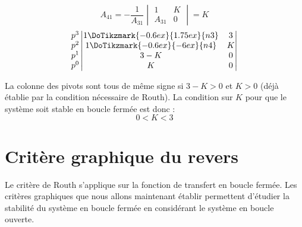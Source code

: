\[
A_{41}=-\dfrac{1}{A_{31}}\begin{vmatrix} 1 & K \\ A_{31} & 0 \end{vmatrix}=K
\]
\[
\begin{matrix}
    p^3 \\
    p^2 \\
    p^1 \\
    p^0 \\
\end{matrix}
\begin{vmatrix}
    1\DoTikzmark{-0.6ex}{1.75ex}{n3}   & 3  \\
    1\DoTikzmark{-0.6ex}{-6ex}{n4}     & K  \\
    3-K                      & 0  \\
    K                        & 0    
    \end{vmatrix}
\]

La colonne des pivots sont tous de même signe si $3-K>0$ et $K>0$ (déjà établie 
par la condition nécessaire de Routh). La condition sur $K$ pour que le 
système soit stable en boucle fermée est donc :
\[
    0<K<3
\]
\section{Critère graphique du revers
}
Le critère de Routh s'applique sur la fonction de transfert en boucle fermée. 
Les critères graphiques que nous allons maintenant établir 
permettent d'étudier la stabilité du système en boucle fermée en considérant 
le système en boucle ouverte.

